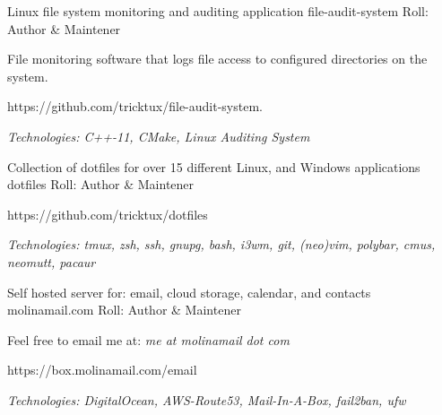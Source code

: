

\begin{cventries}
  \cventry
  {Linux file system monitoring and auditing application} %
  {file-audit-system} %
  {} %
  {Roll: Author \& Maintener} %
  {
    \begin{cvitems} %
    \item {File monitoring software that logs file access to configured directories on the system.}
    \item {https://github.com/tricktux/file-audit-system.}
    \item {\it{Technologies:} C++-11, CMake, Linux Auditing System}
    \end{cvitems}
  }

  \cventry
		{Collection of dotfiles for over 15 different Linux, and Windows applications} %
    {dotfiles} %
    {} %
		{Roll: Author \& Maintener} %
    {
      \begin{cvitems} %
				\item {https://github.com/tricktux/dotfiles}
				\item {\it{Technologies:} tmux, zsh, ssh, gnupg, bash, i3wm, git, (neo)vim, polybar, cmus, neomutt, pacaur}
      \end{cvitems}
    }

    \cventry
      {Self hosted server for: email, cloud storage, calendar, and contacts} %
      {molinamail.com} %
      {} %
      {Roll: Author \& Maintener} %
      {
        \begin{cvitems} %
        \item {Feel free to email me at: \it{me at molinamail dot com}}
        \item {https://box.molinamail.com/email}
        \item {\it{Technologies:} DigitalOcean, AWS-Route53, Mail-In-A-Box, fail2ban, ufw }
        \end{cvitems}
      }

\end{cventries}
